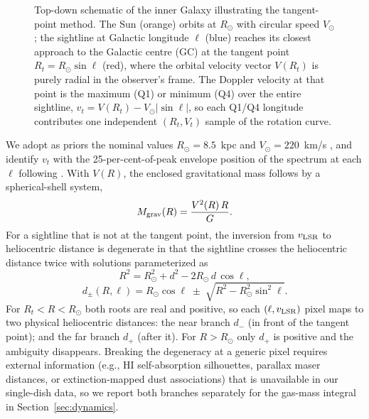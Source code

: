 \documentclass[10pt,preprint2]{aastex}
\begin{document}
\begin{figure}[t!]
\caption{Top-down schematic of the inner Galaxy illustrating the tangent-point method. The Sun (orange) orbits at $R_\odot$ with circular speed $V_\odot$; the sightline at Galactic longitude $\ell$ (blue) reaches its closest approach to the Galactic centre (GC) at the tangent point $R_t = R_\odot \sin\ell$ (red), where the orbital velocity vector $V(R_t)$ is purely radial in the observer's frame. The Doppler velocity at that point is the maximum (Q1) or minimum (Q4) over the entire sightline, $v_t = V(R_t) - V_\odot |\sin\ell|$, so each Q1/Q4 longitude contributes one independent $(R_t, V_t)$ sample of the rotation curve.}
\label{fig:tangent}
\end{figure}
We adopt as priors the nominal values $R_\odot = 8.5$~kpc and $V_\odot = 220$~km/s \citep{KerrLyndenBell1986}, and identify $v_t$ with the 25-per-cent-of-peak envelope position of the spectrum at each $\ell$ following \citet{Burton1988}. With $V(R)$, the enclosed gravitational mass follows by a spherical-shell system,
\begin{equation}
M_{\rm grav}(R) = \frac{V^2(R)\,R}{G}.
\label{eq:Mgrav}
\end{equation}
For a sightline that is not at the tangent point, the inversion from $v_{\rm LSR}$ to heliocentric distance is degenerate in that the sightline crosses the heliocentric distance twice with solutions parameterized as
\begin{equation}
R^2 = R_\odot^2 + d^2 - 2 R_\odot\,d\,\cos\ell,
\label{eq:loc}
\end{equation}
\begin{equation}
d_{\pm}(R, \ell) = R_\odot \cos\ell \;\pm\; \sqrt{R^2 - R_\odot^2 \sin^2\ell}.
\label{eq:kda}
\end{equation}
For $R_t < R < R_\odot$ both roots are real and positive, so each $(\ell, v_{\rm LSR})$ pixel maps to two physical heliocentric distances: the near branch $d_-$ (in front of the tangent point); and the far branch $d_+$ (after it). For $R > R_\odot$ only $d_+$ is positive and the ambiguity disappears. Breaking the degeneracy at a generic pixel requires external information (e.g., HI self-absorption silhouettes, parallax maser distances, or extinction-mapped dust associations) that is unavailable in our single-dish data, so we report both branches separately for the gas-mass integral in Section~\ref{sec:dynamics}.
\end{document}
